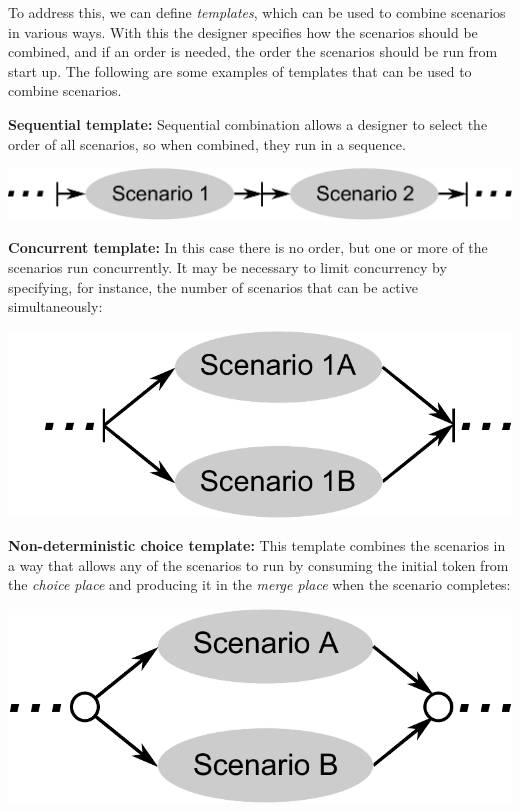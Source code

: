 \documentclass[british, journal]{IEEEtran}
\begin{document}
To address this, we can define \emph{templates},
which can be used to combine scenarios in various ways.
With this the designer specifies how the scenarios should
be combined, and if an order is needed, the order the scenarios should
be run from start up. The following are some examples of templates
that can be used to combine scenarios.

\textbf{Sequential template:} Sequential combination allows a designer
to select the order of all scenarios, so when combined, they run in a
sequence.

\begin{center}
\includegraphics[scale=0.42]{Images/sequential_combination}
\end{center}

\textbf{Concurrent template:} In this case there is no order, but one or more
of the scenarios run concurrently. It may be necessary
to limit concurrency by specifying, for instance, the number of scenarios
that can be active simultaneously:

\vspace{-1mm}
\begin{center}
\includegraphics[scale=0.42]{Images/concurrent_combination}
\end{center}

\textbf{Non-deterministic choice template:} This template combines the
scenarios in a way that allows any of the scenarios to run by consuming the
initial token from the \emph{choice place} and producing it in the
\emph{merge place} when the scenario completes:

\vspace{2mm}
\begin{center}
\includegraphics[scale=0.42]{Images/non_deterministic_combination}
\end{center}
\end{document}
